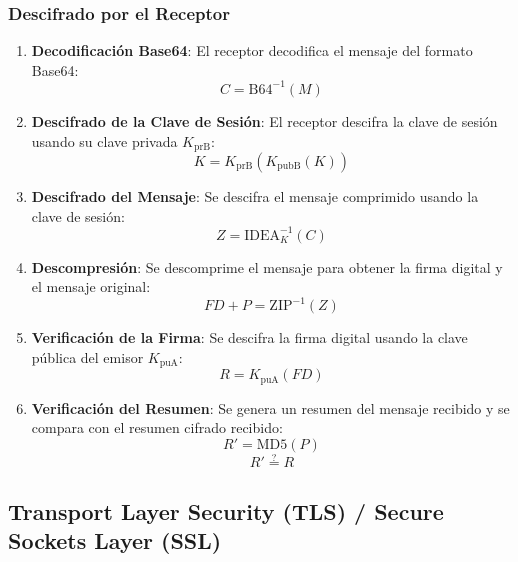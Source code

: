 \documentclass[a4paper,12pt]{article}
\begin{document}
\subsubsection*{Descifrado por el Receptor}
\begin{enumerate}
    \item \textbf{Decodificación Base64}: El receptor decodifica el mensaje del formato Base64:
    \begin{equation}
        C = \text{B64}^{-1}(M)
    \end{equation}
    \item \textbf{Descifrado de la Clave de Sesión}: El receptor descifra la clave de sesión usando su clave privada \(K_{\text{prB}}\):
    \begin{equation}
        K = K_{\text{prB}}(K_{\text{pubB}}(K))
    \end{equation}
    \item \textbf{Descifrado del Mensaje}: Se descifra el mensaje comprimido usando la clave de sesión:
    \begin{equation}
        Z = \text{IDEA}_K^{-1}(C)
    \end{equation}
    \item \textbf{Descompresión}: Se descomprime el mensaje para obtener la firma digital y el mensaje original:
    \begin{equation}
        FD + P = \text{ZIP}^{-1}(Z)
    \end{equation}
    \item \textbf{Verificación de la Firma}: Se descifra la firma digital usando la clave pública del emisor \(K_{\text{puA}}\):
    \begin{equation}
        R = K_{\text{puA}}(FD)
    \end{equation}
    \item \textbf{Verificación del Resumen}: Se genera un resumen del mensaje recibido y se compara con el resumen cifrado recibido:
    \begin{equation}
        R' = \text{MD5}(P)
    \end{equation}
    \begin{equation}
        R' \stackrel{?}{=} R
    \end{equation}
\end{enumerate}





\subsection{Transport Layer Security (TLS) / Secure Sockets Layer (SSL)}
\end{document}
